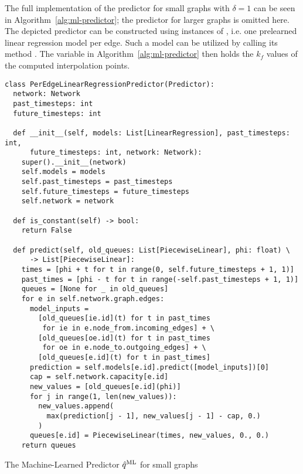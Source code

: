 The full implementation of the predictor for small graphs with $\delta = 1$ can be seen in Algorithm~\ref{alg:ml-predictor}; the predictor for larger graphs is omitted here.
The depicted predictor can be constructed using instances of , i.e. one prelearned linear regression model per edge.
Such a model can be utilized by calling its method .
The variable  in Algorithm~\ref{alg:ml-predictor} then holds the $k_f$ values of the computed interpolation points. 

\begin{algorithm}[H]
  \begin{verbatim}
class PerEdgeLinearRegressionPredictor(Predictor):
  network: Network
  past_timesteps: int
  future_timesteps: int

  def __init__(self, models: List[LinearRegression], past_timesteps: int,
      future_timesteps: int, network: Network):
    super().__init__(network)
    self.models = models
    self.past_timesteps = past_timesteps
    self.future_timesteps = future_timesteps
    self.network = network

  def is_constant(self) -> bool:
    return False

  def predict(self, old_queues: List[PiecewiseLinear], phi: float) \ 
      -> List[PiecewiseLinear]:
    times = [phi + t for t in range(0, self.future_timesteps + 1, 1)]
    past_times = [phi - t for t in range(-self.past_timesteps + 1, 1)]
    queues = [None for _ in old_queues]
    for e in self.network.graph.edges:
      model_inputs = 
        [old_queues[ie.id](t) for t in past_times
         for ie in e.node_from.incoming_edges] + \
        [old_queues[oe.id](t) for t in past_times
         for oe in e.node_to.outgoing_edges] + \
        [old_queues[e.id](t) for t in past_times]
      prediction = self.models[e.id].predict([model_inputs])[0]
      cap = self.network.capacity[e.id]
      new_values = [old_queues[e.id](phi)]
      for j in range(1, len(new_values)):
        new_values.append(
          max(prediction[j - 1], new_values[j - 1] - cap, 0.)
        )
      queues[e.id] = PiecewiseLinear(times, new_values, 0., 0.)
    return queues
  \end{verbatim}
  \caption{The Machine-Learned Predictor $\hat q^{\text{ML}}$ for small graphs}
  \label{alg:ml-predictor}
\end{algorithm}
    